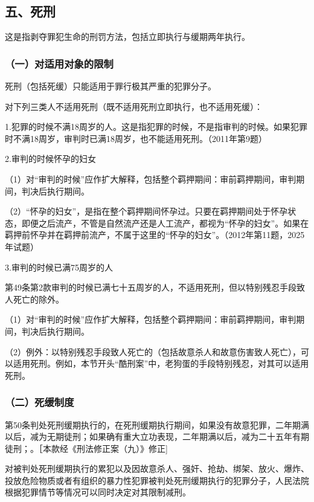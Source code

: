 \subsection*{五、死刑}

这是指剥夺罪犯生命的刑罚方法，包括立即执行与缓期两年执行。

\subsubsection*{（一）对适用对象的限制}

死刑（包括死缓）只能适用于罪行极其严重的犯罪分子。

对下列三类人不适用死刑（既不适用死刑立即执行，也不适用死缓）：

1.犯罪的时候不满18周岁的人。这是指犯罪的时候，不是指审判的时候。如果犯罪时不满18周岁，审判时已满18周岁，也不能适用死刑。（2011年第9题）

2.审判的时候怀孕的妇女

（1）对“审判的时候”应作扩大解释，包括整个羁押期间：审前羁押期间，审判期间，判决后执行期间。

（2）“怀孕的妇女”，是指在整个羁押期间怀孕过。只要在羁押期间处于怀孕状态，即便之后流产，不管是自然流产还是人工流产，都视为“怀孕的妇女”。如果在羁押前怀孕并在羁押前流产，不属于这里的“怀孕的妇女”。（2012年第11题，2025年试题）

3.审判的时候已满75周岁的人

第49条第2款审判的时候已满七十五周岁的人，不适用死刑，但以特别残忍手段致人死亡的除外。

（1）对“审判的时候”应作扩大解释，包括整个羁押期间：审前羁押期间，审判期间，判决后执行期间。

（2）例外：以特别残忍手段致人死亡的（包括故意杀人和故意伤害致人死亡），可以适用死刑。例如，本节开头“酷刑案”中，老狗蛋的手段特别残忍，对其可以适用死刑。

\subsubsection*{（二）死缓制度}

第50条判处死刑缓期执行的，在死刑缓期执行期间，如果没有故意犯罪，二年期满以后，减为无期徒刑；如果确有重大立功表现，二年期满以后，减为二十五年有期徒刑；。［本款经《刑法修正案（九）》修正]

对被判处死刑缓期执行的累犯以及因故意杀人、强奸、抢劫、绑架、放火、爆炸、投放危险物质或者有组织的暴力性犯罪被判处死刑缓期执行的犯罪分子，人民法院根据犯罪情节等情况可以同时决定对其限制减刑。

